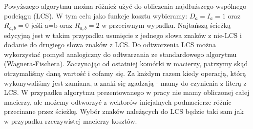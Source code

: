 \documentclass[12pt]{article}
\begin{document}
Powyższego algorytmu można różnież użyć do obliczenia najdłuższego wspólnego podciągu (LCS). W tym celu jako funkcje kosztu wybieramy:
$D_a = I_a = 1$ oraz $R_{a,b} = 0$ jeśli a=b oraz $R_{a,b} = 2$ w przeciwnym wypadku. Najtańszą ścieżką edycyjną jest w takim przypadku usunięcie z jednego słowa znaków z nie-LCS i dodanie do drugiego słowa znaków z LCS. Do odtworzenia LCS można wykorzystać pomysł analogiczny do odtwarzania ze standardowego algorytmu (Wagnera-Fischera). Zaczynając od ostatniej komórki w macierzy, patrzymy skąd otrzymaliśmy daną wartość i cofamy się. Za każdym razem kiedy operacją, którą wykonywaliśmy jest zamiana, a znaki się zgadzają - mamy do czynienia z literą z LCS. W przypadku algorytmu prezentowanego w pracy nie mamy obliczonej całej macierzy, ale możemy odtworzyć z wektorów inicjalnych podmacierze różnic przecinane przez ścieżkę. Wybór znaków należących do LCS będzie taki sam jak w przypadku rzeczywistej macierzy kosztów.
\end{document}
